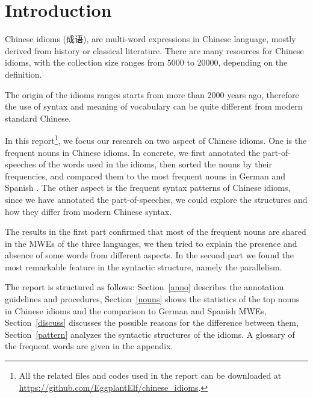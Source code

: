 \section{Introduction}
Chinese idioms (成语), are multi-word expressions in Chinese language, mostly derived from history or classical literature. There are many resources for Chinese idioms, with the collection size ranges from 5000 to 20000, depending on the definition.


The origin of the idioms ranges starts from more than 2000 years ago, therefore the use of syntax and meaning of vocabulary can be quite different from modern standard Chinese. 

In this report\footnote{All the related files and codes used in the report can be downloaded at \url{https://github.com/EggplantElf/chinese_idioms}.}, we focus our research on two aspect of Chinese idioms. 
One is the frequent nouns in Chinese idioms. In concrete, we first annotated the part-of-speeches of the words used in the idioms, then sorted the nouns by their frequencies, and compared them to the most frequent nouns in German and Spanish \citep{mahlow:2013, Duden:2008, Seco:2004}. 
The other aspect is the frequent syntax patterns of Chinese idioms, since we have annotated the part-of-speeches, we could explore the structures and how they differ from modern Chinese syntax.

The results in the first part confirmed that most of the frequent nouns are shared in the MWEs of the three languages, we then tried to explain the presence and absence of some words from different aspects.
In the second part we found the most remarkable feature in the syntactic structure, namely the parallelism. 

The report is structured as follows: Section~\ref{anno} describes the annotation guidelines and procedures, Section~\ref{nouns} shows the statistics of the top nouns in Chinese idioms and the comparison to German and Spanish MWEs, Section~\ref{discuss} discusses the possible reasons for the difference between them, Section~\ref{pattern} analyzes the syntactic structures of the idioms. A glossary of the frequent words are given in the appendix.
